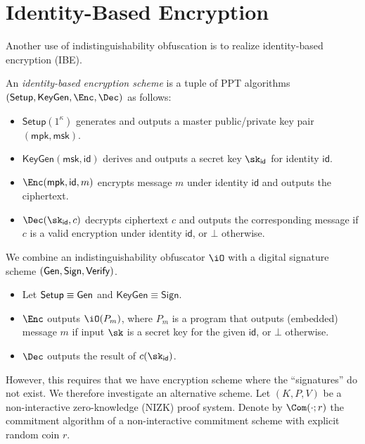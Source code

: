 \section{Identity-Based Encryption}

Another use of indistinguishability obfuscation is to realize
identity-based encryption (IBE).

\newcommand{\SETUP}{\ensuremath{\mathsf{Setup}}}
\newcommand{\KEYGEN}{\ensuremath{\mathsf{KeyGen}}}
\newcommand{\mpk}{\ensuremath{\mathsf{mpk}}}
\newcommand{\msk}{\ensuremath{\mathsf{msk}}}
\newcommand{\id}{\ensuremath{\mathsf{id}}}

\begin{definition}
An \emph{identity-based encryption scheme} is a tuple of PPT algorithms
$(\SETUP, \KEYGEN, \Enc, \Dec)$ as follows:
\begin{itemize}
\item
	$\SETUP(1^\kappa)$ generates and outputs a master public/private
	key pair $(\mpk, \msk)$.
\item
	$\KEYGEN(\msk, \id)$ derives and outputs a secret key
	$\sk_{\id}$ for identity $\id$.
\item
	$\Enc(\mpk, \id, m)$ encrypts message $m$ under identity $\id$
	and outputs the ciphertext.
\item
	$\Dec(\sk_{\id}, c)$ decrypts ciphertext $c$ and outputs the
	corresponding message if $c$ is a valid encryption under
	identity $\id$, or $\bot$ otherwise.
\end{itemize}
\end{definition}

\newcommand{\SIGN}{\ensuremath{\mathsf{Sign}}}
\newcommand{\VERIFY}{\ensuremath{\mathsf{Verify}}}

We combine an indistinguishability obfuscator $\iO$ with a digital
signature scheme $(\GEN, \SIGN, \VERIFY)$.
\begin{itemize}
\item
	Let $\SETUP \equiv \GEN$ and $\KEYGEN \equiv \SIGN$.
\item
	$\Enc$ outputs $\iO(P_m)$, where $P_m$ is a program that
	outputs (embedded) message $m$ if input $\sk$ is a secret key for
	the given $\id$, or $\bot$ otherwise.
\item
	$\Dec$ outputs the result of $c(\sk_{\id})$.
\end{itemize}
However, this requires that we have encryption scheme where the
``signatures'' do not exist.
We therefore investigate an alternative scheme.
%
%
Let $(K, P, V)$ be a non-interactive zero-knowledge (NIZK) proof system.
Denote by $\Com(\cdot ; r)$ the commitment algorithm of a non-interactive
commitment scheme with explicit random coin $r$.

